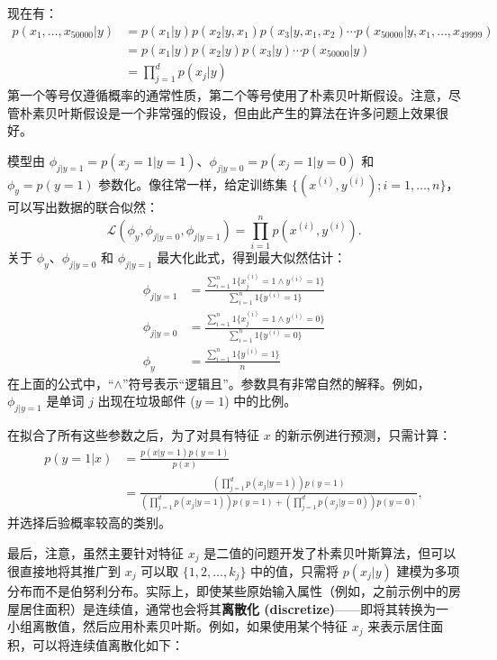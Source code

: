 现在有：
\[
    \begin{aligned}
        p(x_1, \dots, x_{50000}|y) &= p(x_1|y)p(x_2|y, x_1)p(x_3|y, x_1, x_2) \cdots p(x_{50000}|y, x_1, \dots, x_{49999}) \\ 
        &= p(x_1|y)p(x_2|y)p(x_3|y) \cdots p(x_{50000}|y) \\ 
        &= \prod_{j=1}^d p(x_j|y) 
    \end{aligned}
\]
第一个等号仅遵循概率的通常性质，第二个等号使用了朴素贝叶斯假设。注意，尽管朴素贝叶斯假设是一个非常强的假设，但由此产生的算法在许多问题上效果很好。

模型由 $\phi_{j|y=1} = p(x_j=1|y=1)$、$\phi_{j|y=0} = p(x_j=1|y=0)$ 和 $\phi_y = p(y=1)$ 参数化。像往常一样，给定训练集 $\{(x^{(i)}, y^{(i)}); i=1, \dots, n\}$，可以写出数据的联合似然：
\[
    \mathcal{L}(\phi_y, \phi_{j|y=0}, \phi_{j|y=1}) = \prod_{i=1}^n p(x^{(i)}, y^{(i)}).
\]
关于 $\phi_y$、$\phi_{j|y=0}$ 和 $\phi_{j|y=1}$ 最大化此式，得到最大似然估计：
\[
    \begin{aligned}
        \phi_{j|y=1} &= \frac{\sum_{i=1}^n {1}\{x_j^{(i)} = 1 \wedge y^{(i)} = 1\}}{\sum_{i=1}^n {1}\{y^{(i)} = 1\}} \\ 
        \phi_{j|y=0} &= \frac{\sum_{i=1}^n {1}\{x_j^{(i)} = 1 \wedge y^{(i)} = 0\}}{\sum_{i=1}^n {1}\{y^{(i)} = 0\}} \\ 
        \phi_y &= \frac{\sum_{i=1}^n {1}\{y^{(i)} = 1\}}{n} 
    \end{aligned}
\]
在上面的公式中，“$\wedge$”符号表示“逻辑且”。参数具有非常自然的解释。例如，$\phi_{j|y=1}$ 是单词 $j$ 出现在垃圾邮件 ($y=1$) 中的比例。

在拟合了所有这些参数之后，为了对具有特征 $x$ 的新示例进行预测，只需计算：
\[
\begin{aligned}
    p(y=1|x) &= \frac{p(x|y=1)p(y=1)}{p(x)} \\
    &= \frac{\left(\prod_{j=1}^d p(x_j|y=1)\right) p(y=1)}{\left(\prod_{j=1}^d p(x_j|y=1)\right) p(y=1) + \left(\prod_{j=1}^d p(x_j|y=0)\right) p(y=0)},
\end{aligned}
\]
并选择后验概率较高的类别。

最后，注意，虽然主要针对特征 $x_j$ 是二值的问题开发了朴素贝叶斯算法，但可以很直接地将其推广到 $x_j$ 可以取 $\{1, 2, \dots, k_j\}$ 中的值，只需将 $p(x_j|y)$ 建模为多项分布而不是伯努利分布。实际上，即使某些原始输入属性（例如，之前示例中的房屋居住面积）是连续值，通常也会将其\textbf{离散化 (discretize)}——即将其转换为一小组离散值，然后应用朴素贝叶斯。例如，如果使用某个特征 $x_j$ 来表示居住面积，可以将连续值离散化如下：

